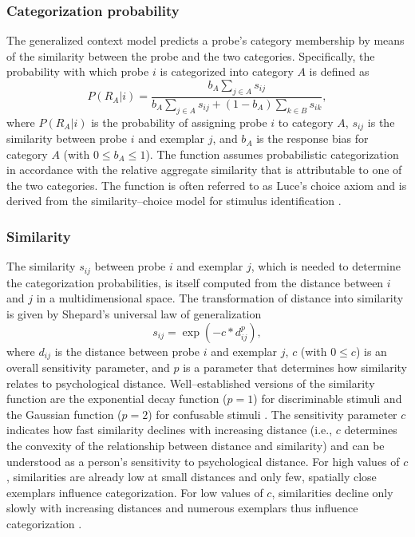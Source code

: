 \documentclass[a4paper,man,natbib]{apa6}
\begin{document}
\subsubsection{Categorization probability}
The generalized context model \citep{nosofsky1989further} predicts a probe's category membership by means of the similarity between the probe and the two categories. Specifically, the probability with which probe $i$ is categorized into category $A$ is defined as 
\begin{equation}
P(R_{A}|i) = \frac{b_{A}\sum\limits_{j \in A} s_{ij}}{b_{A}\sum\limits_{j \in A} s_{ij} + (1 - b_{A})\sum\limits_{k \in B} s_{ik}},
\label{eq:probability}
\end{equation}
where $P(R_{A}|i)$ is the probability of assigning probe $i$ to category $A$, $s_{ij}$ is the similarity between probe $i$ and exemplar $j$, and $b_{A}$ is the response bias for category $A$ (with $0 \leq b_{A} \leq 1$). The function assumes probabilistic categorization in accordance with the relative aggregate similarity that is attributable to one of the two categories. The function is often referred to as Luce's choice axiom \citep{luce1959individual} and is derived from the similarity--choice model for stimulus identification \citep{luce1963detection, shepard1957stimulus}. 

\subsubsection{Similarity}
The similarity $s_{ij}$ between probe $i$ and exemplar $j$, which is needed to determine the categorization probabilities, is itself computed from the distance between $i$ and $j$ in a multidimensional space. The transformation of distance into similarity is given by Shepard's universal law of generalization \citep{shepard1987toward}
\begin{equation}
s_{ij} = \exp\left(-c*d_{ij}^p\right),
\label{eq:similarity}
\end{equation}
where $d_{ij}$ is the distance between probe $i$ and exemplar $j$, $c$ (with $0 \leq c$) is an overall sensitivity parameter, and $p$ is a parameter that determines how similarity relates to psychological distance. Well--established versions of the similarity function are the exponential decay function ($p = 1$) for discriminable stimuli and the Gaussian function ($p = 2$) for confusable stimuli \citep{ennis1988confusable, nosofsky1985luce}. The sensitivity parameter $c$ indicates how fast similarity declines with increasing distance (i.e., $c$ determines the convexity of the relationship between distance and similarity) and can be understood as a person's sensitivity to psychological distance. For high values of $c$, similarities are already low at small distances and only few, spatially close exemplars influence categorization. For low values of $c$, similarities decline only slowly with increasing distances and numerous exemplars thus influence categorization \citep{nosofsky2011generalized}.
\end{document}
